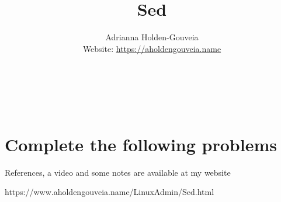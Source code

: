 \documentclass[12pt]{article}
\title{Sed}
\author{
        Adrianna Holden-Gouveia \\
        Website: \url{https://aholdengouveia.name}\\ 
        \date{\vspace{-5ex}}
        \faLinkedin{: aholdengouveia} \\
        \faGithub {: aholdengouveia} \\
        \faTwitter {: aholdengouveia} \\
        }
\begin{document}
    

\maketitle


\section*{Complete the following problems}

References, a video and some notes are available at my website

https://www.aholdengouveia.name/LinuxAdmin/Sed.html
\end{document}
